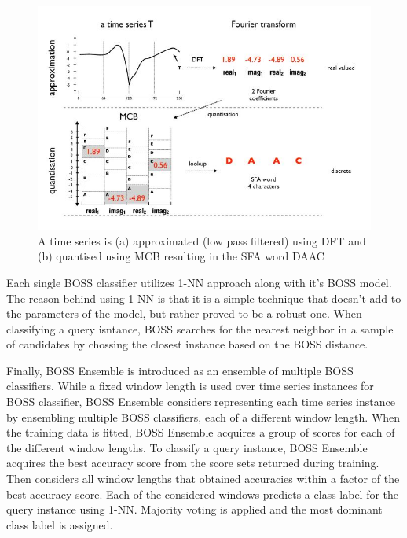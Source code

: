 \begin{figure}[!htbp]
    \captionsetup{justification=raggedright}
    \centering
    \includegraphics[scale = 0.5]{BOSS_SFA.JPG}
    \centering
    \caption{A time series is (a) approximated (low pass filtered) using DFT and (b) quantised using MCB resulting in the SFA word DAAC \cite{schafer2015boss}}
    \label{Img:BOSS_SFA}
\end{figure}

Each single BOSS classifier utilizes 1-NN approach along with it's BOSS model. The reason behind using 1-NN is that it is a simple technique 
that doesn't add to the parameters of the model, but rather proved to be a robust one. When classifying a query isntance, BOSS searches
for the nearest neighbor in a sample of candidates by chossing the closest instance based on the BOSS distance.

Finally, BOSS Ensemble is introduced as an ensemble of multiple BOSS classifiers. While a fixed window length is used over time series instances for BOSS classifier,
BOSS Ensemble considers representing each time series instance by ensembling multiple BOSS classifiers, each of a different window length.
When the training data is fitted, BOSS Ensemble acquires a group of scores for each of the different window lengths.
To classify a query instance, BOSS Ensemble acquires the best accuracy score from the score sets returned during training.
Then considers all window lengths that obtained accuracies within a factor of the best accuracy score.
Each of the considered windows predicts a class label for the query instance using 1-NN. Majority voting is applied and the most dominant
class label is assigned.

